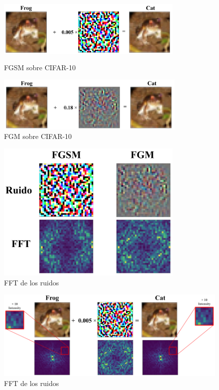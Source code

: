 \begin{figure}[h!]
    \centering
    \includegraphics[width=0.80\textwidth]{images/cifar-10/frog_cat_fgsm.png}
    \label{frog_cat_fgsm}
    \caption{FGSM sobre CIFAR-10}
\end{figure}

\begin{figure}[h!]
    \centering
    \includegraphics[width=0.81\textwidth]{images/cifar-10/frog_cat_fgm.png}
    \caption{FGM sobre CIFAR-10}
    \label{frog_cat_fgm}
\end{figure}

\begin{figure}[h!]
    \centering
    \includegraphics[width=0.8\textwidth]{images/cifar-10/frog_noises.png}
    \caption{FFT de los ruidos}
    \label{frog_ruidos}
\end{figure}


\begin{figure}[h!]
    \centering
    \includegraphics[width=\textwidth]{images/cifar-10/frog_cat_fgsm_fft.png}
    \caption{FFT de los ruidos}
    \label{frog_cat_fft}
\end{figure}




